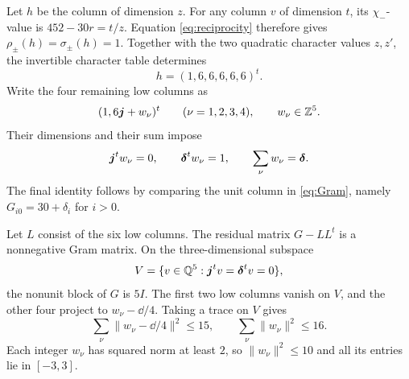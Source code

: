 \documentclass[11pt]{article}
\theoremstyle{remark}\newtheorem{remark}[theorem]{Remark}
\begin{document}
Let $h$ be the column of dimension $z$. For any column $v$ of dimension $t$, its $\chi_-$-value is $452-30r=t/z$. Equation \eqref{eq:reciprocity} therefore gives $\rho_\pm(h)=\sigma_\pm(h)=1$. Together with the two quadratic character values $z,z'$, the invertible character table determines
\[
h=(1,6,6,6,6,6)^t.
\]
Write the four remaining low columns as
\[
(1,6\boldsymbol{j}+w_\nu)^t\qquad(\nu=1,2,3,4),\qquad w_\nu\in\mathbb Z^5.
\]
Their dimensions and their sum impose
\begin{equation}\label{eq:wconstraints}
\boldsymbol{j}^tw_\nu=0,\qquad\boldsymbol{\delta}^tw_\nu=1,\qquad\sum_\nu w_\nu=\boldsymbol{\delta}.
\end{equation}
The final identity follows by comparing the unit column in \eqref{eq:Gram}, namely $G_{i0}=30+\delta_i$ for $i>0$.

Let $L$ consist of the six low columns. The residual matrix $G-LL^t$ is a nonnegative Gram matrix. On the three-dimensional subspace
\[
V=\{v\in\mathbb Q^5:\boldsymbol{j}^tv=\boldsymbol{\delta}^tv=0\},
\]
the nonunit block of $G$ is $5I$. The first two low columns vanish on $V$, and the other four project to $w_\nu-\dd/4$. Taking a trace on $V$ gives
\[
\sum_\nu\|w_\nu-\dd/4\|^2\le15,
\qquad \sum_\nu\|w_\nu\|^2\le16.
\]
Each integer $w_\nu$ has squared norm at least $2$, so $\|w_\nu\|^2\le10$ and all its entries lie in $[-3,3]$.
\end{document}
